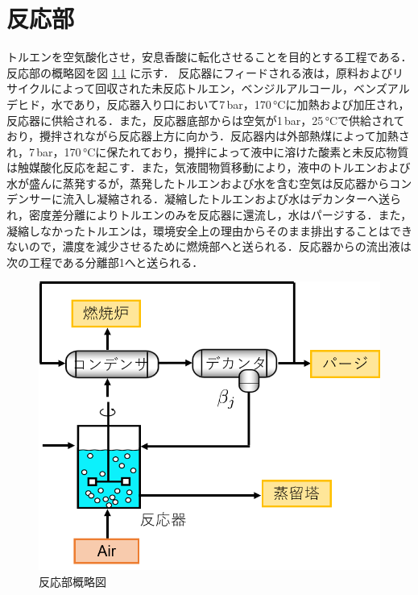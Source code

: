 \documentclass[a4j]{jsreport}
\begin{document}
\clearpage
\chapter{反応部}
トルエンを空気酸化させ，安息香酸に転化させることを目的とする工程である．
反応部の概略図を図 \ref{反応部設計結果の概略図} に示す．
反応器にフィードされる液は，原料およびリサイクルによって回収された未反応トルエン，ベンジルアルコール，ベンズアルデヒド，水であり，反応器入り口において7\,\si{\bar}，170\,\si{\degreeCelsius}に加熱および加圧され，反応器に供給される．また，反応器底部からは空気が1\,\si{\bar}，25\,\si{\degreeCelsius}で供給されており，攪拌されながら反応器上方に向かう．反応器内は外部熱煤によって加熱され，7\,\si{\bar}，170\,\si{\degreeCelsius}に保たれており，攪拌によって液中に溶けた酸素と未反応物質は触媒酸化反応を起こす．また，気液間物質移動により，液中のトルエンおよび水が盛んに蒸発するが，蒸発したトルエンおよび水を含む空気は反応器からコンデンサーに流入し凝縮される．凝縮したトルエンおよび水はデカンターへ送られ，密度差分離によりトルエンのみを反応器に還流し，水はパージする．また，凝縮しなかったトルエンは，環境安全上の理由からそのまま排出することはできないので，濃度を減少させるために燃焼部へと送られる．反応器からの流出液は次の工程である分離部1へと送られる．
\begin{figure}[htbp]
  \centering
  \includegraphics[scale=0.7]{ReactionSection.png}
  \caption{反応部概略図}
  \label{反応部設計結果の概略図}
\end{figure}
\end{document}

